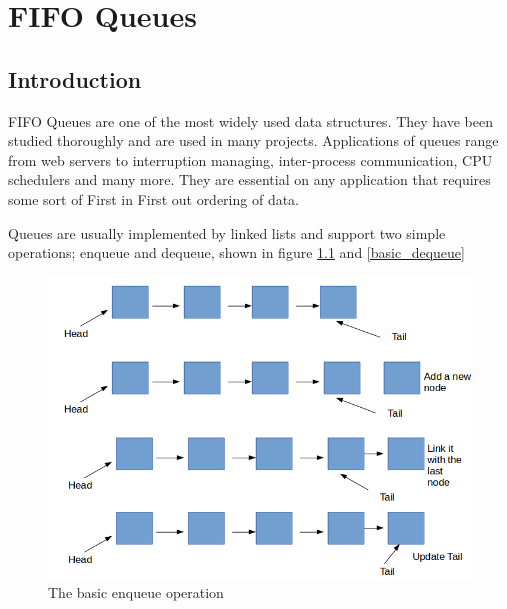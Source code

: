 \def\<#1>{\textit{#1}}

\chapter{FIFO Queues}
\section{Introduction}

FIFO Queues are one of the most widely used data structures. They have been studied thoroughly and are used in many projects. Applications of queues range from web servers to interruption managing, inter-process communication, CPU schedulers and many more. They are essential on any application that requires some sort of First in First out ordering of data.

Queues are usually implemented by linked lists and support two simple operations; enqueue and dequeue, shown in figure \ref{basic_enqueue} and \ref{basic_dequeue}


\begin{figure}
 \centering
  \includegraphics[scale=0.5]{basic_enqueue.png}
\caption{ The basic enqueue operation}
\label{basic_enqueue}
\end{figure}

